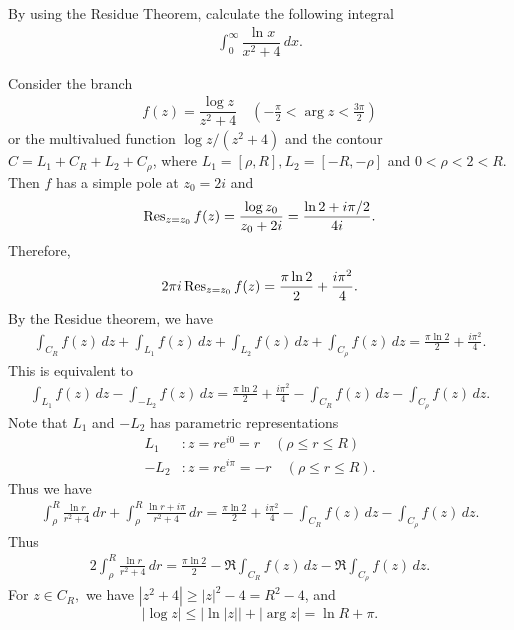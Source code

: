 \begin{problem}
By using the Residue Theorem, calculate the following integral
\begin{align*}
    \int_0^\infty \dfrac{\ln x}{x^2 + 4} \,dx.
\end{align*}
\begin{solution}
Consider the branch 
\begin{align*}
    f(z)=\dfrac{\log z}{z^2 + 4} \quad (-\frac{\pi}{2} < \arg z < \frac{3\pi}{2})
\end{align*}
or the multivalued function $\log z/(z^2+4)$ and the contour $C = L_1 + C_R + L_2 + C_\rho$, where $L_1=[\rho, R], L_2 = [-R,-\rho]$ and $0<\rho<2<R.$ Then $f$ has a simple pole at $z_0 =2i$ and 
\begin{align*}
    \operatorname{Res}_{z = z_0} f(z) = \frac{\log z_0}{z_0 + 2i} = \frac{\ln 2 + i\pi/2}{4i}.
\end{align*}
Therefore,
\begin{align*}
    2\pi i \operatorname{Res}_{z=z_0} f(z) = \frac{\pi\ln 2}{2} + \frac{i\pi^2}{4}.
\end{align*}
By the Residue theorem, we have 
\begin{align*}
    \int_{C_R} f(z) \,dz + \int_{L_1} f(z) \,dz + \int_{L_2} f(z) \,dz + \int_{C_\rho} f(z) \,dz = \frac{\pi\ln 2}{2} + \frac{i\pi^2}{4}.
\end{align*}
This is equivalent to
\begin{align*}
      \int_{L_1} f(z) \,dz - \int_{-L_2} f(z) \,dz = \frac{\pi\ln 2}{2} + \frac{i\pi^2}{4} - \int_{C_R} f(z) \,dz - \int_{C_\rho } f(z) \,dz.
\end{align*}
Note that $L_1$ and $-L_2$ has parametric representations
\begin{align*}
    L_1&: z = re^{i0} = r\quad (\rho \le r \le R) \\
    -L_2&: z = re^{i\pi} = -r\quad (\rho \le r \le R).
\end{align*}
Thus we have 
\begin{align*}
    \int_{\rho}^R \frac{\ln r}{r^2 + 4} \,dr + \int_\rho^R \frac{\ln r + i\pi}{r^2 + 4} \,dr = \frac{\pi\ln 2}{2} + \frac{i\pi^2}{4} - \int_{C_R} f(z) \,dz - \int_{C_\rho } f(z) \,dz.
\end{align*}
Thus 
\begin{align*}
    2 \int_{\rho}^R \frac{\ln r}{r^2 + 4} \,dr = \frac{\pi \ln 2}{2} - \Re \int_{C_R} f(z) \,dz - \Re \int_{C_\rho} f(z) \,dz.
\end{align*}
For $z \in C_R,$ we have $|z^2 + 4| \ge |z|^2 - 4 = R^2 - 4$, and
$$ |\log z| \le |\ln |z|| + |\arg z| = \ln R + \pi. $$

\end{solution}
\end{problem}
